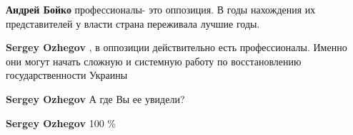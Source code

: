 \begin{itemize}
\begin{itemize}
\textbf{Андрей Бойко} профессионалы- это оппозиция. В годы нахождения их представителей у власти страна переживала лучшие годы.

 
\textbf{Sergey Ozhegov} , в оппозиции действительно есть профессионалы. Именно они могут начать сложную и системную работу по восстановлению государственности Украины

 
\textbf{Sergey Ozhegov} А где Вы ее увидели?

 
\textbf{Sergey Ozhegov} 100 \%
\end{itemize}

\end{itemize}

